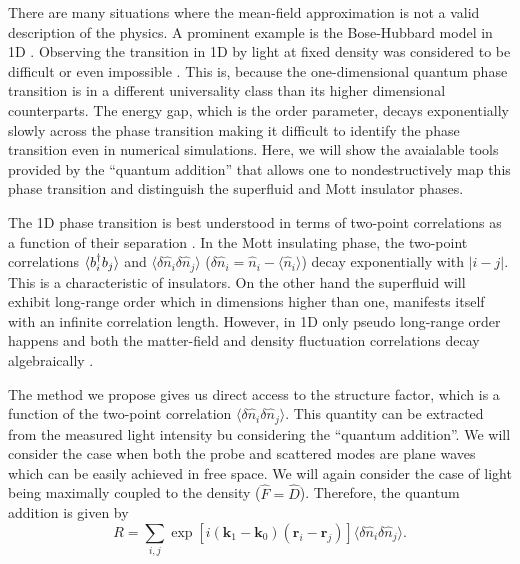 There are many situations where the mean-field approximation is not a
valid description of the physics. A prominent example is the
Bose-Hubbard model in 1D \cite{cazalilla2011, ejima2011, kuhner2000,
  pino2012, pino2013}. Observing the transition in 1D by light at
fixed density was considered to be difficult \cite{rogers2014} or even
impossible \cite{roth2003}. This is, because the one-dimensional
quantum phase transition is in a different universality class than its
higher dimensional counterparts. The energy gap, which is the order
parameter, decays exponentially slowly across the phase transition
making it difficult to identify the phase transition even in numerical
simulations. Here, we will show the avaialable tools provided by the
``quantum addition'' that allows one to nondestructively map this
phase transition and distinguish the superfluid and Mott insulator
phases.

The 1D phase transition is best understood in terms of two-point
correlations as a function of their separation \cite{giamarchi}. In
the Mott insulating phase, the two-point correlations $\langle b^\dagger_i
b_j \rangle$ and $\langle \delta \hat{n}_i \delta \hat{n}_j \rangle$
($\delta \hat{n}_i =\hat{n}_i-\langle \hat{n}_i\rangle$) decay
exponentially with $|i-j|$. This is a characteristic of insulators. On
the other hand the superfluid will exhibit long-range order which in
dimensions higher than one, manifests itself with an infinite
correlation length. However, in 1D only pseudo long-range order
happens and both the matter-field and density fluctuation correlations
decay algebraically \cite{giamarchi}.

The method we propose gives us direct access to the structure factor,
which is a function of the two-point correlation $\langle \delta
\hat{n}_i \delta \hat{n}_j \rangle$. This quantity can be extracted
from the measured light intensity bu considering the ``quantum
addition''. We will consider the case when both the probe and
scattered modes are plane waves which can be easily achieved in free
space. We will again consider the case of light being maximally
coupled to the density ($\hat{F} = \hat{D}$). Therefore, the quantum
addition is given by
\begin{equation} 
  R =\sum_{i, j} \exp[i (\mathbf{k}_1 - \mathbf{k}_0)
  (\mathbf{r}_i - \mathbf{r}_j)] \langle \delta \hat{n}_i \delta
  \hat{n}_j \rangle.
\end{equation}


